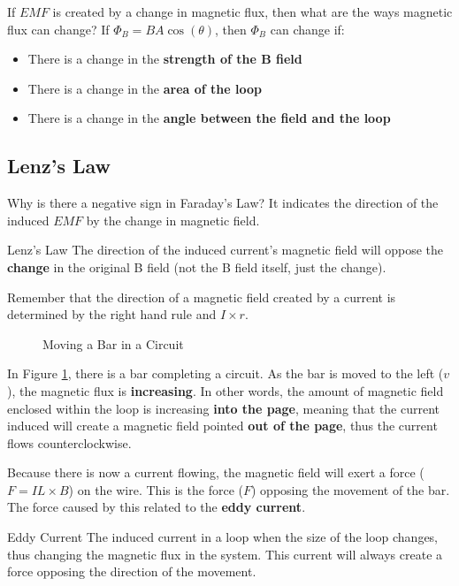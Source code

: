 \documentclass[12pt]{article}
\begin{document}
If $EMF$ is created by a change in magnetic flux, then what are the ways magnetic flux
can change? If $\Phi_B = BA\cos(\theta)$, then $\Phi_B$ can change if:
\begin{itemize}
  \itemsep0em
  \item There is a change in the \textbf{strength of the B field}
  \item There is a change in the \textbf{area of the loop}
  \item There is a change in the \textbf{angle between the field and the loop}
\end{itemize}

\subsection{Lenz's Law}
\label{ssec:lenzsLaw}

Why is there a negative sign in Faraday's Law? It indicates the direction of the induced
$EMF$ by the change in magnetic field.

\begin{definition}{Lenz's Law}
  The direction of the induced current's magnetic field will oppose the \textbf{change}
  in the original B field (not the B field itself, just the change).
\end{definition}

Remember that the direction of a magnetic field created by a current is determined by
the right hand rule and $I \times r$.

\begin{figure}[H]
  \centering
  
  \caption{Moving a Bar in a Circuit}
  \label{fig:045}
\end{figure}

In Figure \ref{fig:045}, there is a bar completing a circuit. As the bar is moved to the
left ($v$), the magnetic flux is \textbf{increasing}. In other words, the amount of magnetic
field enclosed within the loop is increasing \textbf{into the page}, meaning that the
current induced will create a magnetic field pointed \textbf{out of the page}, thus the
current flows counterclockwise.

Because there is now a current flowing, the magnetic field will exert a force
($F = IL \times B$) on the wire. This is the force ($F$) opposing the movement of the bar.
The force caused by this related to the \textbf{eddy current}.

\begin{definition}{Eddy Current}
  The induced current in a loop when the size of the loop changes, thus changing the
  magnetic flux in the system. This current will always create a force opposing the
  direction of the movement.
\end{definition}
\end{document}
